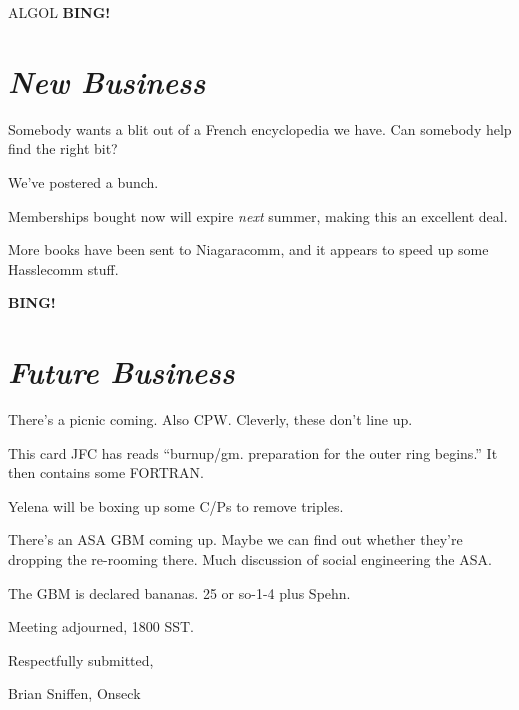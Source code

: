 \documentclass[10pt]{article}
\newcommand{\bing}{{\bf BING!} }
\newcommand{\goto}[1]{\bing \vskip 12pt \section*{{\em{#1}}}}
\newcommand{\ps}{ plus Spehn\xspace}
\begin{document}
ALGOL
\goto{New Business}
Somebody wants a blit out of a French encyclopedia we have.  Can
somebody help find the right bit?

We've postered a bunch.

Memberships bought now will expire \emph{next} summer, making this an
excellent deal.

More books have been sent to Niagaracomm, and it appears to speed up
some Hasslecomm stuff.

\goto{Future Business}
There's a picnic coming.  Also CPW.  Cleverly, these don't line up.

This card JFC has reads ``burnup/gm.  preparation for the outer ring
begins.''  It then contains some FORTRAN.

Yelena will be boxing up some C/Ps to remove triples.

There's an ASA GBM coming up.  Maybe we can find out whether they're
dropping the re-rooming there.  Much discussion of social engineering
the ASA.

The GBM is declared bananas. 25 or so-1-4\ps.

\vspace{12pt}

\noindent
Meeting adjourned, 1800 SST.

\vspace{18pt}

\centerline{Respectfully submitted,}
\centerline{Brian Sniffen, Onseck}
\end{document}
